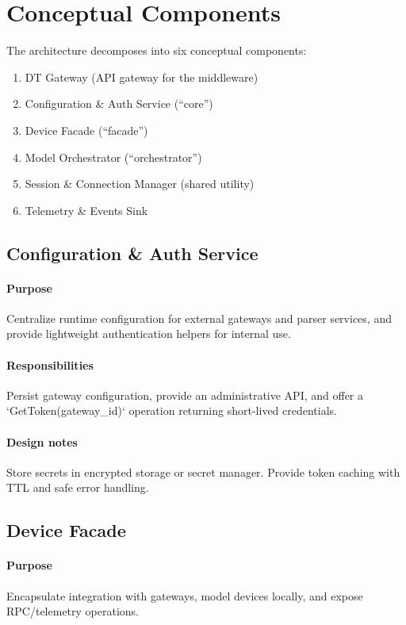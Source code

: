\documentclass[11pt,a4paper]{article}
\begin{document}
\section{Conceptual Components}
The architecture decomposes into six conceptual components:
\begin{enumerate}
  \item DT Gateway (API gateway for the middleware)
  \item Configuration \& Auth Service (``core'')
  \item Device Facade (``facade'')
  \item Model Orchestrator (``orchestrator'')
  \item Session \& Connection Manager (shared utility)
  \item Telemetry \& Events Sink
\end{enumerate}

\subsection{Configuration \& Auth Service}
\paragraph{Purpose}
Centralize runtime configuration for external gateways and parser services, and provide lightweight authentication helpers for internal use.

\paragraph{Responsibilities}
Persist gateway configuration, provide an administrative API, and offer a `GetToken(gateway_id)` operation returning short-lived credentials.

\paragraph{Design notes}
Store secrets in encrypted storage or secret manager. Provide token caching with TTL and safe error handling.

\subsection{Device Facade}
\paragraph{Purpose}
Encapsulate integration with gateways, model devices locally, and expose RPC/telemetry operations.
\end{document}
